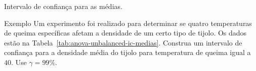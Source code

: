 \documentclass[8pt]{beamer}
\begin{document}
\begin{frame}{Intervalo de confiança para as médias.}
\begin{block}{Exemplo}
	Um experimento foi realizado para determinar se quatro temperaturas de queima específicas afetam a densidade de um certo tipo de tijolo. Os dados estão na Tabela~\ref{tab:anova-unbalanced-ic-medias}. Construa um intervalo de confiança para a densidade média do tijolo para temperatura de queima igual a $40$. Use $\gamma = 99\%$.
	\begin{table}[htbp]
		\centering
		\caption{Informações do experimento.}
		\label{tab:anova-unbalanced-ic-medias}
	\end{table}
\end{block}
\end{frame}
\end{document}
